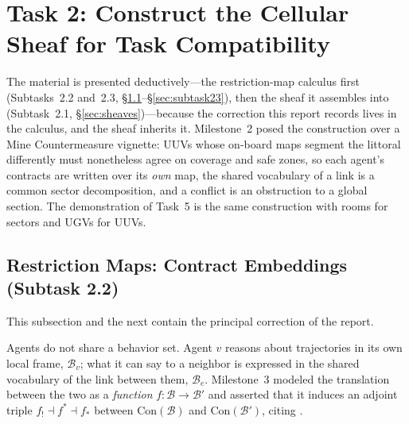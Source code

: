\documentclass[11pt]{article}
\newif\ifshowcomments
\newcommand{\contract}[1]{\mathrm{Con}(#1)}
\theoremstyle{definition}
\theoremstyle{remark}
\newcommand{\prompt}[1]{%
    \ifshowcomments
        ~\todo[inline, color=techgold!80, textcolor=black,caption={Task}]{{\bf Prompt:} #1}%
    \fi
}
\newcommand{\ai}[1]{%
    \ifshowcomments
        \noindent\textcolor{techred}{[AI Agent]: #1}%
    \fi
}
\begin{document}
\ai{Milestone~3 discharged the distributivity half with ``one verifies by direct computation'';
the full computation was written out in an earlier draft of this report and is retained in the
repository history. It is the one place the two composition formulas could have come apart, and
the agreement is also machine-checked.}

\section{Task 2: Construct the Cellular Sheaf for Task Compatibility}
\label{sec:task2}

\prompt{This task constructs a cellular sheaf over an undirected graph representing the agent
network, with vertices as agents and edges as communication links. Enriched categories are
assigned to stalks, and restriction maps (enriched functors) enforce local consistency, with
global sections representing conflict-free task distributions.}

The material is presented deductively---the restriction-map calculus first
(Subtasks~2.2 and~2.3, \S\ref{sec:embeddings}--\S\ref{sec:subtask23}), then the sheaf it
assembles into (Subtask~2.1, \S\ref{sec:sheaves})---because the correction this report records
lives in the calculus, and the sheaf inherits it.
Milestone~2 posed the construction over a Mine Countermeasure vignette: UUVs whose on-board
maps segment the littoral differently must nonetheless agree on coverage and safe zones, so
each agent's contracts are written over its \emph{own} map, the shared vocabulary of a link is
a common sector decomposition, and a conflict is an obstruction to a global section.
The demonstration of Task~5 is the same construction with rooms for sectors and UGVs for UUVs.

\subsection{Restriction Maps: Contract Embeddings (Subtask 2.2)}
\label{sec:embeddings}

This subsection and the next contain the principal correction of the report.

Agents do not share a behavior set.
Agent $v$ reasons about trajectories in its own local frame, $\mathcal{B}_v$; what it can say
to a neighbor is expressed in the shared vocabulary of the link between them, $\mathcal{B}_e$.
Milestone~3 modeled the translation between the two as a \emph{function}
$f : \mathcal{B} \to \mathcal{B}'$ and asserted that it induces an adjoint triple
$f_! \dashv f^* \dashv f_*$ between $\contract{\mathcal{B}}$ and $\contract{\mathcal{B}'}$,
citing \citet{naikContractEmbeddingsLayered2025}.
\end{document}
